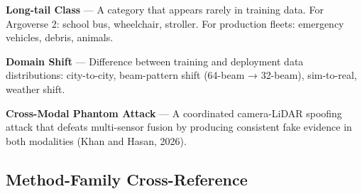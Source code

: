 \textbf{Long-tail Class} --- A category that appears rarely in training data. For Argoverse 2: school bus, wheelchair, stroller. For production fleets: emergency vehicles, debris, animals.

\textbf{Domain Shift} --- Difference between training and deployment data distributions: city-to-city, beam-pattern shift (64-beam → 32-beam), sim-to-real, weather shift.

\textbf{Cross-Modal Phantom Attack} --- A coordinated camera-LiDAR spoofing attack that defeats multi-sensor fusion by producing consistent fake evidence in both modalities (Khan and Hasan, 2026).

\subsection{Method-Family Cross-Reference}\label{method-family-cross-reference}

